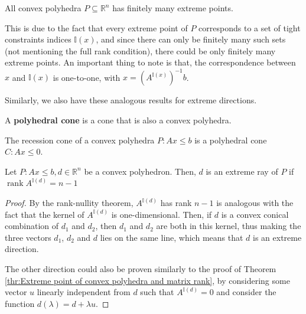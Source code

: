 \begin{corollary}
\label{cor:Finiteness of extreme points in convex polyhedra}
  All convex polyhedra \( P \subseteq \mathbb{R}^{n} \) has finitely many
  extreme points.
\end{corollary}

This is due to the fact that every extreme point of \( P \) corresponds to a set
of tight constraints indices \( \mathbb{I}(x) \), and since there can only be
finitely many such sets (not mentioning the full rank condition), there could
be only finitely many extreme points. An important thing to note is that, the
correspondence between \( x \) and \( \mathbb{I}(x) \) is one-to-one, with \( x
= \left(  A^{\mathbb{I}(x)} \right)^{-1}b\).

Similarly, we also have these analogous results for extreme directions.

\begin{definition}
\label{def:Polyhedral cone}
  A \textbf{polyhedral cone} is a cone that is also a convex polyhedra.
\end{definition}

\begin{theorem}
\label{thr:Recession cone of a convex polyhedra is polyhedral}
  The recession cone of a convex polyhedra \( P: Ax \le  b \) is a polyhedral
  cone \( C: Ax \le 0 \).
\end{theorem}

\begin{theorem}
\label{thr:Extreme directions of convex polyhedra and matrix rank}
  Let \( P: Ax \le  b, d \in \mathbb{R}^{n} \) be a convex polyhedron.
  Then, \( d \) is an extreme
  ray of \( P \) if \( \operatorname{rank} A^{\mathbb{I}(d)} = n - 1 \)
\end{theorem}

\begin{proof}
  By the rank-nullity theorem, \( A^{\mathbb{I}(d)} \) has rank \( n - 1 \) is
  analogous with the fact that the kernel of \( A^{\mathbb{I}(d)} \) is
  one-dimensional. Then, if \( d \) is a convex conical combination of \( d_{1}
  \) and \( d_{2} \), then \( d_{1} \) and \( d_{2} \) are both in this kernel,
  thus making the three vectors \( d_{1} \), \( d_{2} \) and \( d \) lies on the
  same line, which means that \( d \) is an extreme direction.

  The other direction could also be proven similarly to the proof of Theorem
  \ref{thr:Extreme point of convex polyhedra and matrix rank}, by considering
  some vector \(
  u\) linearly independent from \( d \) such that \( A^{\mathbb{I}(d)} = 0 \)
  and consider the function \( d(\lambda) = d + \lambda u \).
\end{proof}

